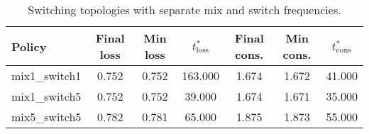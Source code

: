 \begin{table}[t]
\centering
\begin{tabular}{lcccccc}
\toprule
Policy & Final loss & Min loss & $t^*_{\text{loss}}$ & Final cons. & Min cons. & $t^*_{\text{cons}}$ \\
\midrule
mix1_switch1 & 0.752 & 0.752 & 163.000 & 1.674 & 1.672 & 41.000 \\
mix1_switch5 & 0.752 & 0.752 & 39.000 & 1.674 & 1.671 & 35.000 \\
mix5_switch5 & 0.782 & 0.781 & 65.000 & 1.875 & 1.873 & 55.000 \\
\bottomrule
\end{tabular}
\caption{Switching topologies with separate mix and switch frequencies.}
\label{tab:dgd_switching}
\end{table}
